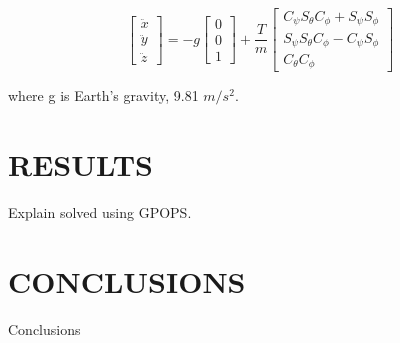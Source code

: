 \documentclass[letterpaper, 10 pt, conference]{ieeeconf}  %
\begin{document}
$$\left[ \begin{array}{c}{\ddot{x}} \\ {\ddot{y}} \\ {\ddot{z}}\end{array}\right]=-g \left[ \begin{array}{l}{0} \\ {0} \\ {1}\end{array}\right]+\frac{T}{m} \left[ \begin{array}{c}{C_{\psi} S_{\theta} C_{\phi}+S_{\psi} S_{\phi}} \\ {S_{\psi} S_{\theta} C_{\phi}-C_{\psi} S_{\phi}} \\ {C_{\theta} C_{\phi}}\end{array}\right]$$

where g is Earth's gravity, 9.81 $m/s^2$.
 




\section{RESULTS}\label{s:exp}

Explain solved using GPOPS.

  

\section{CONCLUSIONS}\label{s:conclusions}

Conclusions

\addtolength{\textheight}{-12cm}   %

\end{document}
